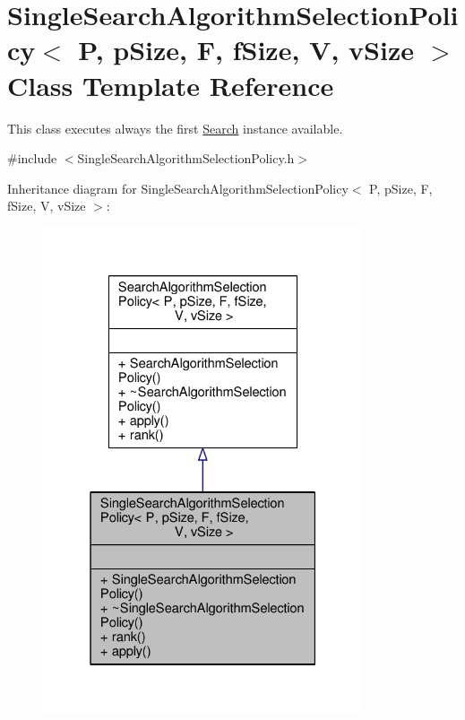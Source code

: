 \hypertarget{classSingleSearchAlgorithmSelectionPolicy}{}\section{Single\+Search\+Algorithm\+Selection\+Policy$<$ P, p\+Size, F, f\+Size, V, v\+Size $>$ Class Template Reference}
\label{classSingleSearchAlgorithmSelectionPolicy}


This class executes always the first \hyperlink{classSearch}{Search} instance available.  




{\ttfamily \#include $<$Single\+Search\+Algorithm\+Selection\+Policy.\+h$>$}



Inheritance diagram for Single\+Search\+Algorithm\+Selection\+Policy$<$ P, p\+Size, F, f\+Size, V, v\+Size $>$\+:\nopagebreak
\begin{figure}[H]
\begin{center}
\leavevmode
\includegraphics[width=268pt]{classSingleSearchAlgorithmSelectionPolicy__inherit__graph}
\end{center}
\end{figure}


